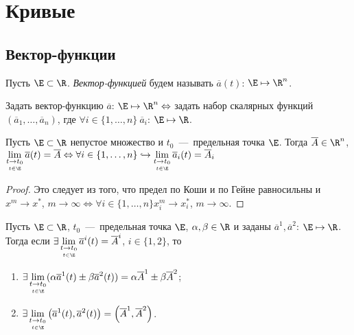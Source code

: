 \section{Кривые}
\subsection{Вектор-функции}
\begin{definition}
    Пусть $\E \subset \R$. \textit{Вектор-функцией} будем называть $\overline{a} (t)$: $\E \mapsto \R^n$.
\end{definition}
\begin{note}
    Задать вектор-функцию $\overline{a}$: $\E \mapsto \R^n \Leftrightarrow $ задать набор скалярных функций $(\overline{a}_{1}, \ldots, \overline{a}_{n})$, где $\forall i \in \{1, \ldots, n\} \ \overline{a}_{i}$: $\E \mapsto \R$.
\end{note}
\begin{lemma}
    Пусть $\E \subset \R$ непустое множество и $t_{0}$~---~предельная точка $\E$. Тогда $\overline{A} \in \R^n$, $\lim\limits_{\underset{t \in \E}{t\to t_0}} \overline{a}(t) = \overline{A} \Leftrightarrow \forall i \in \{1, \ldots, n\} \hookrightarrow \lim\limits_{\underset{t \in \E}{t\to t_0}} \overline{a}_{i}(t) = \overline{A}_{i}$
\end{lemma}
\begin{proof}
    Это следует из того, что предел по Коши и по Гейне равносильны и $x^m \to x^*$, $m\to \infty \Leftrightarrow \forall i \in \{1, \ldots, n\} x^{m}_{i} \to x^{*}_{i}$, $m\to \infty$.
\end{proof}
\begin{lemma}
    Пусть $\E \subset \R$, $t_{0}$~---~предельная точка $\E$, $\alpha, \beta \in \R$ и заданы $\overline{a}^{1}, \overline{a}^{2}$: $\E \mapsto \R$. Тогда если $\displaystyle \exists \lim\limits_{\underset{t \in \E}{t\to t_0}} \overline{a}^{i} (t) = \overline{A}^{i}$, $i \in \{1, 2\}$, то 
    \begin{enumerate}
        \item $\displaystyle \exists \lim\limits_{\underset{t \in \E}{t\to t_0}} (\alpha \overline{a}^{1}(t) \pm \beta \overline{a}^{2} (t)) = \alpha \overline{A}^{1} \pm \beta \overline{A}^{2}$;
        \item $\displaystyle \exists \lim\limits_{\underset{t \in \E}{t\to t_0}} \left(\overline{a}^{1}(t), \overline{a}^{2} (t)\right) = \left(\overline{A}^{1}, \overline{A}^{2}\right)$.
    \end{enumerate}
\end{lemma}
